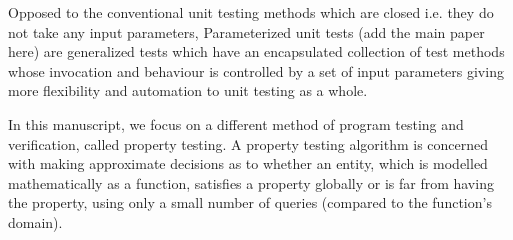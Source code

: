 Opposed to the conventional unit testing methods which are closed i.e. they do not take any input parameters, Parameterized unit tests (add the main paper here) %
are generalized tests which have an encapsulated collection of test methods whose invocation and behaviour is controlled by a set of input parameters giving more flexibility and automation to unit testing as a whole. 

In this manuscript, we focus on a different method of program testing and verification, called property testing. A property testing algorithm is concerned with making approximate decisions as to whether an entity, which is modelled mathematically as a function, satisfies a property globally or is far from having the property, using only a small number of queries (compared to the function's domain).
